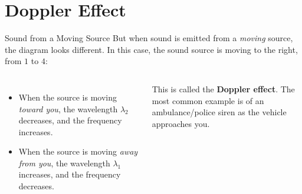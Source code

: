 \documentclass[12pt,aspectratio=169]{beamer}
\begin{document}
\section[Doppler]{Doppler Effect}

\begin{frame}{Sound from a Moving Source}
  But when sound is emitted from a \emph{moving} source, the diagram looks
  different. In this case, the sound source is moving to the right, from $1$ to
  $4$:

  \begin{columns}    
      
    \begin{itemize}
    \item When the source is moving \emph{toward you}, the wavelength
      $\lambda_2$ decreases, and the frequency increases.
    \item When the source is moving \emph{away from you}, the wavelength
      $\lambda_1$ increases, and the frequency decreases.
    \end{itemize}
    \vspace{.15in}This is called the \textbf{Doppler effect}. The most
    common example is of an ambulance/police siren as the vehicle approaches
    you.
  \end{columns}
\end{frame}
\end{document}
